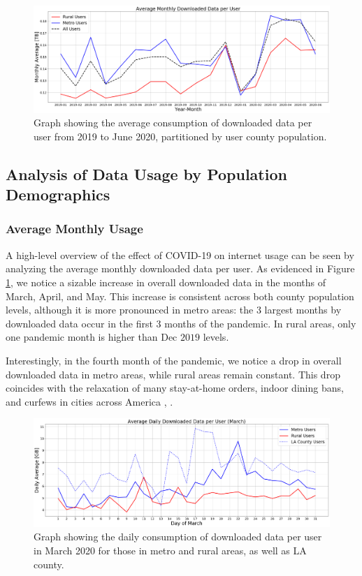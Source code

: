 \begin{figure}
\centering
\includegraphics[width=1.0\linewidth]{figs/monthly_downloaded_data.png}
\caption{Graph showing the average consumption of downloaded data per user from 2019 to June 2020, partitioned by user county population.}
\label{fig:downloadmetro_rural}
\end{figure}

\subsection{Analysis of Data Usage by Population Demographics}

\subsubsection{Average Monthly Usage}
A high-level overview of the effect of COVID-19 on internet usage can be seen by analyzing the average monthly downloaded data per user. As evidenced in Figure \ref{fig:downloadmetro_rural}, we notice a sizable increase in overall downloaded data in the months of March, April, and May. This increase is consistent across both county population levels, although it is more pronounced in metro areas: the 3 largest months by downloaded data occur in the first 3 months of the pandemic. In rural areas, only one pandemic month is higher than Dec $2019$ levels.

Interestingly, in the fourth month of the pandemic, we notice a drop in overall downloaded data in metro areas, while rural areas remain constant. This drop coincides with the relaxation of many stay-at-home orders, indoor dining bans, and curfews in cities across America \cite{money2020la}, \cite{gov2020nyc}. 

\begin{figure}
\centering
\includegraphics[width=1.0\linewidth]{figs/daily_downloaded_data.png}
\caption{Graph showing the daily consumption of downloaded data per user in March 2020 for those in metro and rural areas, as well as LA county.}
\label{fig:dailymetro_rural}
\end{figure}

